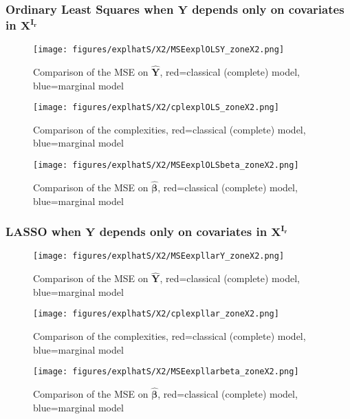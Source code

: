 \documentclass[12pt,a4paper]{report}
\begin{document}
\FloatBarrier

\newpage
\subsubsection{Ordinary Least Squares when $\boldsymbol{Y}$ depends only on covariates in $\boldsymbol{X^{I_r}}$}

	\begin{figure}[h!]
	\centering
		  \texttt{[image: figures/explhatS/X2/MSEexplOLSY\_zoneX2.png]}
		\caption{Comparison of the MSE on $\hat{\boldsymbol{Y}}$, red=classical (complete) model, blue=marginal model}\label{MSEexplOLSY_zoneX2}
	\end{figure}
	\begin{figure}[h!]
	\centering
		  \texttt{[image: figures/explhatS/X2/cplexplOLS\_zoneX2.png]}
		\caption{Comparison of the complexities, red=classical (complete) model, blue=marginal model}\label{cplexplOLS_zoneX2}
	\end{figure}
	\begin{figure}[h!]
	\centering
		  \texttt{[image: figures/explhatS/X2/MSEexplOLSbeta\_zoneX2.png]}
		\caption{Comparison of the MSE on $\hat{\boldsymbol{\beta}}$, red=classical (complete) model, blue=marginal model}\label{MSEexplOLSbeta_zoneX2}
	\end{figure}
	\FloatBarrier
\newpage
\subsubsection{LASSO when $\boldsymbol{Y}$ depends only on covariates in $\boldsymbol{X^{I_r}}$}

	\begin{figure}[h!]
	\centering
		  \texttt{[image: figures/explhatS/X2/MSEexpllarY\_zoneX2.png]}
		\caption{Comparison of the MSE on $\hat{\boldsymbol{Y}}$, red=classical (complete) model, blue=marginal model}\label{MSEexpllarY_zoneX2}
	\end{figure}
	\begin{figure}[h!]
	\centering
		  \texttt{[image: figures/explhatS/X2/cplexpllar\_zoneX2.png]}
		\caption{Comparison of the complexities, red=classical (complete) model, blue=marginal model}\label{cplexpllar_zoneX2}
	\end{figure}
	\begin{figure}[h!]
	\centering
		  \texttt{[image: figures/explhatS/X2/MSEexpllarbeta\_zoneX2.png]}
		\caption{Comparison of the MSE on $\hat{\boldsymbol{\beta}}$, red=classical (complete) model, blue=marginal model}\label{MSEexpllarbeta_zoneX2}
	\end{figure}
	\FloatBarrier
\newpage
\end{document}
